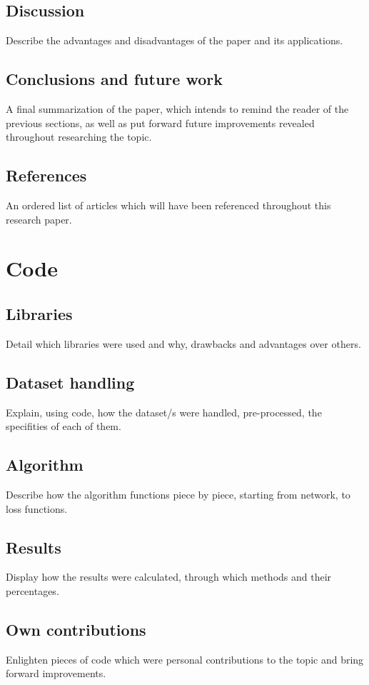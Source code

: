 \documentclass[a4paper]{article}
\begin{document}
\subsection{Discussion}
Describe the advantages and disadvantages of the paper and its applications.

\subsection{Conclusions and future work}
A final summarization of the paper, which intends to remind the reader of the previous sections,
as well as put forward future improvements revealed throughout researching the topic.

\subsection{References}
An ordered list of articles which will have been referenced throughout this research paper.

\section{Code}

\subsection{Libraries}
Detail which libraries were used and why, drawbacks and advantages over others.

\subsection{Dataset handling}
Explain, using code, how the dataset/s were handled, pre-processed, the specifities of each of them.

\subsection{Algorithm}
Describe how the algorithm functions piece by piece, starting from network, to loss functions.

\subsection{Results}
Display how the results were calculated, through which methods and their percentages.

\subsection{Own contributions}
Enlighten pieces of code which were personal contributions to the topic and bring forward improvements.
\end{document}
